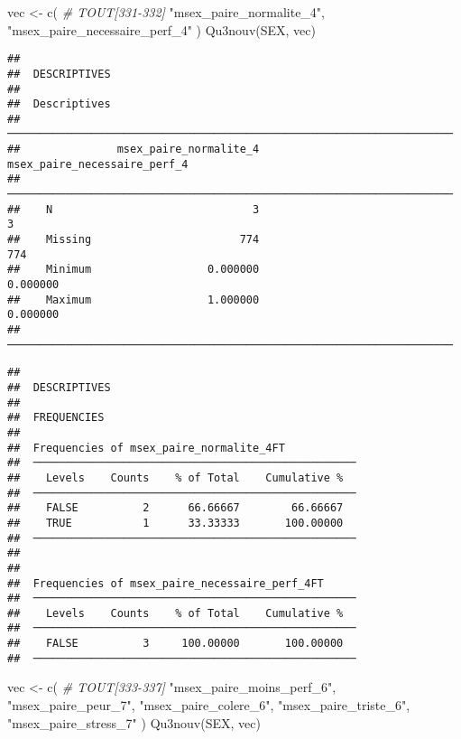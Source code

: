 \documentclass[
]{article}
\newenvironment{Shaded}{\begin{snugshade}}{\end{snugshade}}
\newcommand{\CommentTok}[1]{\textcolor[rgb]{0.56,0.35,0.01}{\textit{#1}}}
\newcommand{\FunctionTok}[1]{\textcolor[rgb]{0.00,0.00,0.00}{#1}}
\newcommand{\NormalTok}[1]{#1}
\newcommand{\OtherTok}[1]{\textcolor[rgb]{0.56,0.35,0.01}{#1}}
\newcommand{\StringTok}[1]{\textcolor[rgb]{0.31,0.60,0.02}{#1}}
\begin{document}
\begin{Shaded}
\begin{Highlighting}[]
\NormalTok{vec }\OtherTok{\textless{}{-}} \FunctionTok{c}\NormalTok{(  }\CommentTok{\# TOUT[331{-}332]}
  \StringTok{"msex\_paire\_normalite\_4"}\NormalTok{,}
  \StringTok{"msex\_paire\_necessaire\_perf\_4"}
\NormalTok{)}
\FunctionTok{Qu3nouv}\NormalTok{(SEX, vec)}
\end{Highlighting}
\end{Shaded}

\begin{verbatim}
## 
##  DESCRIPTIVES
## 
##  Descriptives                                                          
##  ───────────────────────────────────────────────────────────────────── 
##               msex_paire_normalite_4    msex_paire_necessaire_perf_4   
##  ───────────────────────────────────────────────────────────────────── 
##    N                               3                               3   
##    Missing                       774                             774   
##    Minimum                  0.000000                        0.000000   
##    Maximum                  1.000000                        0.000000   
##  ─────────────────────────────────────────────────────────────────────
\end{verbatim}

\begin{verbatim}
## 
##  DESCRIPTIVES
## 
##  FREQUENCIES
## 
##  Frequencies of msex_paire_normalite_4FT            
##  ────────────────────────────────────────────────── 
##    Levels    Counts    % of Total    Cumulative %   
##  ────────────────────────────────────────────────── 
##    FALSE          2      66.66667        66.66667   
##    TRUE           1      33.33333       100.00000   
##  ────────────────────────────────────────────────── 
## 
## 
##  Frequencies of msex_paire_necessaire_perf_4FT      
##  ────────────────────────────────────────────────── 
##    Levels    Counts    % of Total    Cumulative %   
##  ────────────────────────────────────────────────── 
##    FALSE          3     100.00000       100.00000   
##  ──────────────────────────────────────────────────
\end{verbatim}

\begin{Shaded}
\begin{Highlighting}[]
\NormalTok{vec }\OtherTok{\textless{}{-}} \FunctionTok{c}\NormalTok{(  }\CommentTok{\# TOUT[333{-}337]}
    \StringTok{"msex\_paire\_moins\_perf\_6"}\NormalTok{,}
    \StringTok{"msex\_paire\_peur\_7"}\NormalTok{,}
    \StringTok{"msex\_paire\_colere\_6"}\NormalTok{,}
    \StringTok{"msex\_paire\_triste\_6"}\NormalTok{,}
    \StringTok{"msex\_paire\_stress\_7"}
\NormalTok{  )}
\FunctionTok{Qu3nouv}\NormalTok{(SEX, vec)}
\end{Highlighting}
\end{Shaded}
\end{document}
